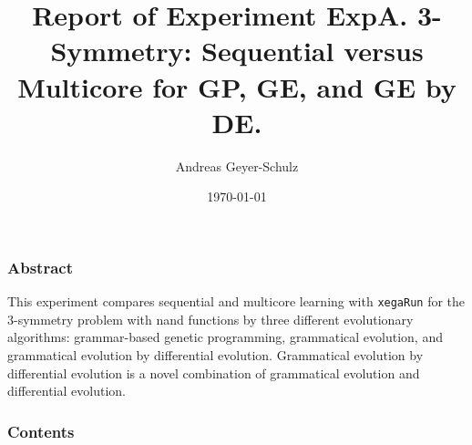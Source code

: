 \documentclass[18pt,c]{beamer}
\makeatletter
\let\beamer@writeslidentry@miniframeson=\beamer@writeslidentry
\newcommand*{\miniframeson}{\let\beamer@writeslidentry=\beamer@writeslidentry@miniframeson}
\makeatother
\begin{document}
\title{Report of Experiment ExpA. 3-Symmetry: Sequential versus Multicore for GP, GE, and GE by DE. }
\author{Andreas Geyer-Schulz}
\date{\today}
\begin{frame}
\titlepage
\end{frame}
\begin{frame}
\frametitle{Abstract}
This experiment compares sequential and multicore learning
with {\tt xegaRun} for the 3-symmetry problem with nand functions
by three different evolutionary algorithms:
grammar-based genetic programming, grammatical evolution,
and grammatical evolution by differential evolution.
Grammatical evolution by differential evolution is a
novel combination of grammatical evolution and differential evolution.%
\end{frame}
\begin{frame}[t, allowframebreaks]
\frametitle{Contents}
\tableofcontents[subsubsectionstyle=hide]
\vfill
\end{frame}
\miniframeson
\end{document}
